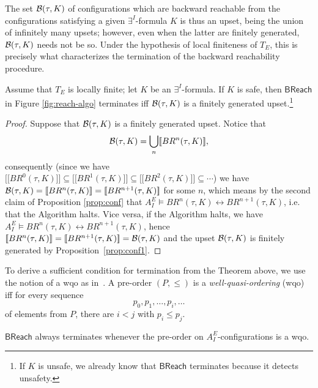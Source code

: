 \documentclass{LMCS}
\newcommand{\cB}{\ensuremath \mathcal B}
\newcommand{\mywidehat}[1]{\ensuremath{\lbrack\!\lbrack #1 \rbrack\!\rbrack}}
\theoremstyle{plain}\newtheorem{assumption}[thm]{Assumption}
\theoremstyle{plain}\newtheorem{proposition}[thm]{Proposition}
\theoremstyle{plain}\newtheorem{property}[thm]{Property}
\theoremstyle{plain}\newtheorem{example}[thm]{Example}
\theoremstyle{plain}\newtheorem{claim}[thm]{Claim}
\theoremstyle{plain}\newtheorem{lemma}[thm]{Lemma}
\begin{document}
The set $\cB(\tau, K)$ of configurations which are backward reachable
from the configurations satisfying a given $\exists^I$-formula $K$ is
thus an upset, being the union of infinitely many upsets; however,
even when the latter are finitely generated, $\cB(\tau, K)$ needs not
be so.  Under the hypothesis of local finiteness of $T_E$, this is
precisely what characterizes the termination of the backward
reachability procedure.
\begin{thm}
  \label{thm:term}
  Assume that $T_E$ is locally finite; let $ K$ be an
  $\exists^I$-formula. If $K$ is safe, then $\mathsf{BReach}$ in
  Figure \ref{fig:reach-algo} terminates iff $\cB(\tau, K)$ is a
  finitely generated upset.\footnote{If $K$ is unsafe, we already know
    that $\mathsf{BReach}$ terminates because it detects unsafety.}
\end{thm}
\begin{proof}
  Suppose that $\cB(\tau, K)$ is a finitely generated upset. Notice
  that
  \begin{eqnarray*}
    \cB(\tau, K)=\bigcup_n\mywidehat{BR^n(\tau, K)},
  \end{eqnarray*}
  consequently (since we have $\mywidehat{BR^0(\tau, K)}\subseteq
  \mywidehat{BR^1(\tau, K)} \subseteq \mywidehat{BR^2(\tau,
    K)}\subseteq \cdots$) we have $\cB(\tau, K)=\mywidehat{BR^n(\tau,
    K)}=\mywidehat{BR^{n+1}(\tau, K)}$ for some $n$, which means by
  the second claim of Proposition \ref{prop:conf} that $A^E_I\models
  BR^n(\tau, K)\leftrightarrow BR^{n+1}(\tau, K)$, i.e. that the
  Algorithm halts. Vice versa, if the Algorithm halts, we have
  $A^E_I\models BR^n(\tau, K)\leftrightarrow BR^{n+1}(\tau, K)$, hence
  $\mywidehat{BR^n(\tau, K)}=\mywidehat{BR^{n+1}(\tau, K)}=\cB(\tau,
  K)$ and the upset $\cB(\tau, K)$ is finitely generated by
  Proposition~\ref{prop:conf1}.
\end{proof}
To derive a sufficient condition for termination from the Theorem
above, we use the notion of a wqo as in~\cite{lics}.  A pre-order $(P,
\leq)$ is a \emph{well-quasi-ordering} (wqo) iff for every sequence
\begin{equation}
  \label{eq:succession}
  p_0, p_1, \dots, p_i, \dots
\end{equation}
of elements from $P$, there are $i<j$ with $p_i\leq p_j$.
\begin{cor}
  \label{coro:termination}
  $\mathsf{BReach}$ always terminates whenever the pre-order on
  $A_I^E$-configurations is a wqo.
\end{cor}
\end{document}
